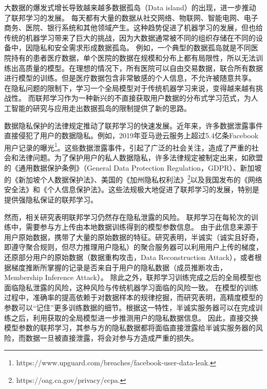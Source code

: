 大数据的爆发式增长导致越来越多数据孤岛（Data island）的出现，进一步推动了联邦学习的发展。
每天都有大量的数据从社交网络、物联网、智能电网、电子商务、医院、银行系统和其他领域产生\cite{hu2016energy}。这种趋势促进了机器学习的发展，但也给传统的机器学习带来了巨大的挑战，因为大数据通常被不同的组织存储在不同的设备中，因隐私和安全需求形成数据孤岛。
例如，一个典型的数据孤岛就是不同医院持有的患者医疗数据，单个医院的数据在规模和分布上都有局限性，所以无法训练出高质量的模型。在理想的情况下，所有医院可以自由交易数据，联合所有数据进行模型的训练。但是医疗数据包含非常敏感的个人信息，不允许被随意共享。
在隐私问题的限制下，学习一个全局模型对于传统机器学习来说，变得越来越有挑战性。
而联邦学习作为一种新兴的不直接获取用户数据的分布式学习范式，为人工智能的研究与应用走出数据孤岛的限制提供了新的思路。

数据隐私保护的法律规定推动了联邦学习的快速发展。近年来，许多数据泄露事件直接侵犯了用户的数据隐私。例如，2019年亚马逊云服务上超过5.4亿条Facebook用户记录的曝光\footnote{https://www.upguard.com/breaches/facebook-user-data-leak.}。这些数据泄露事件，引起了广泛的社会关注，造成了严重的社会和法律问题。为了保护用户的私人数据隐私，许多法律规定被制定出来，如欧盟的《通用数据保护条例》（General Data Protection Regulation，GDPR）\cite{voigt2017eu}、新加坡的《新加坡个人数据保护法》\cite{chik2013singapore}、美国的《加州隐私权利法》\footnote{https://oag.ca.gov/privacy/ccpa.}以及我国发布的《网络安全法》\cite{netsecuritylaw}和《个人信息保护法》\cite{personal_information_protection_law}。这些法规极大地促进了联邦学习的发展，特别是提供强隐私保证的联邦学习。

然而，相关研究\cite{geiping2020inverting, zhu2019deep}表明联邦学习仍然存在隐私泄露的风险。
联邦学习在每轮次的训练中，需要参与方上传由本地数据训练得到的模型参数信息。
由于此信息来源于用户原始数据，携带了大量的原始数据的特征。研究\parencite{zhu2019deep}表明，半诚实（诚实且好奇，即遵守聚合规则，但尽力推理用户隐私）的聚合服务器可以利用用户上传的梯度，还原部分用户的原始数据（数据重构攻击，Data Reconstruction Attack），或者根据梯度推断所掌握的记录是否来自于用户的隐私数据（成员推断攻击，Membership Inference Attack）。
除此之外，联邦学习训练完成之后的全局模型也面临隐私泄露的风险，这种风险与传统机器学习面临的风险一致。
在模型的训练过程中，准确率的提高依赖于对数据样本的规律挖掘，而研究\parencite{song2017machine}表明，高精度模型的参数可以“记住”更多训练数据的细节。根据这一特性，半诚实服务器可以在完成训练之后，利用获取的全局模型进一步推测用户的隐私数据信息。
因此，直接交换模型参数的联邦学习，其参与方的隐私数据都将面临直接泄露给半诚实服务器的风险，而数据一旦被直接泄露，将会对参与方造成严重的损失。

